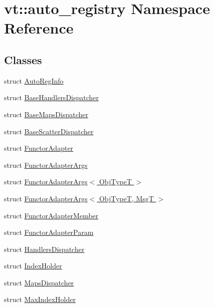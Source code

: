 \hypertarget{namespacevt_1_1auto__registry}{}\section{vt\+:\+:auto\+\_\+registry Namespace Reference}
\label{namespacevt_1_1auto__registry}
\subsection*{Classes}
\begin{DoxyCompactItemize}
\item 
struct \hyperlink{structvt_1_1auto__registry_1_1_auto_reg_info}{Auto\+Reg\+Info}
\item 
struct \hyperlink{structvt_1_1auto__registry_1_1_base_handlers_dispatcher}{Base\+Handlers\+Dispatcher}
\item 
struct \hyperlink{structvt_1_1auto__registry_1_1_base_maps_dispatcher}{Base\+Maps\+Dispatcher}
\item 
struct \hyperlink{structvt_1_1auto__registry_1_1_base_scatter_dispatcher}{Base\+Scatter\+Dispatcher}
\item 
struct \hyperlink{structvt_1_1auto__registry_1_1_functor_adapter}{Functor\+Adapter}
\item 
struct \hyperlink{structvt_1_1auto__registry_1_1_functor_adapter_args}{Functor\+Adapter\+Args}
\item 
struct \hyperlink{structvt_1_1auto__registry_1_1_functor_adapter_args_3_01_obj_type_t_01_4}{Functor\+Adapter\+Args$<$ Obj\+Type\+T $>$}
\item 
struct \hyperlink{structvt_1_1auto__registry_1_1_functor_adapter_args_3_01_obj_type_t_00_01_msg_t_01_4}{Functor\+Adapter\+Args$<$ Obj\+Type\+T, Msg\+T $>$}
\item 
struct \hyperlink{structvt_1_1auto__registry_1_1_functor_adapter_member}{Functor\+Adapter\+Member}
\item 
struct \hyperlink{structvt_1_1auto__registry_1_1_functor_adapter_param}{Functor\+Adapter\+Param}
\item 
struct \hyperlink{structvt_1_1auto__registry_1_1_handlers_dispatcher}{Handlers\+Dispatcher}
\item 
struct \hyperlink{structvt_1_1auto__registry_1_1_index_holder}{Index\+Holder}
\item 
struct \hyperlink{structvt_1_1auto__registry_1_1_maps_dispatcher}{Maps\+Dispatcher}
\item 
struct \hyperlink{structvt_1_1auto__registry_1_1_max_index_holder}{Max\+Index\+Holder}

\end{DoxyCompactItemize}

